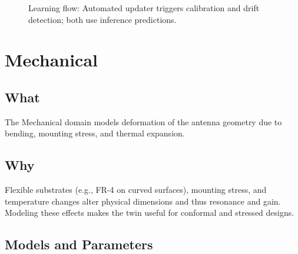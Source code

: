 \documentclass[11pt,a4paper]{article}
\begin{document}
\begin{figure}[htbp]
\centering
{}
\caption{Learning flow: Automated updater triggers calibration and drift detection; both use inference predictions.}
\end{figure}

\section{Mechanical}

\subsection{What}
The Mechanical domain models deformation of the antenna geometry due to bending, mounting stress, and thermal expansion.

\subsection{Why}
Flexible substrates (e.g., FR-4 on curved surfaces), mounting stress, and temperature changes alter physical dimensions and thus resonance and gain. Modeling these effects makes the twin useful for conformal and stressed designs.

\subsection{Models and Parameters}
\end{document}
